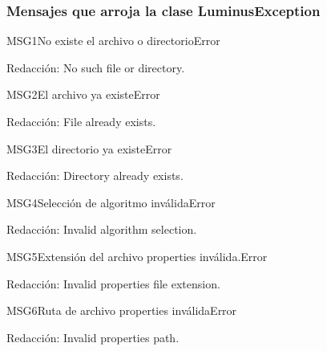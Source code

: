 \subsubsection{Mensajes que arroja la clase LuminusException}
\begin{mensaje}{MSG1}{No existe el archivo o directorio}{Error}
	\item[Redacción:] No such file or directory.
\end{mensaje}
\begin{mensaje}{MSG2}{El archivo ya existe}{Error}
	\item[Redacción:] File already exists.
\end{mensaje}
\begin{mensaje}{MSG3}{El directorio ya existe}{Error}
	\item[Redacción:] Directory already exists.
\end{mensaje}
\begin{mensaje}{MSG4}{Selección de algoritmo inválida}{Error}
	\item[Redacción:] Invalid algorithm selection.
\end{mensaje}
\begin{mensaje}{MSG5}{Extensión del archivo properties inválida.}{Error}
	\item[Redacción:] Invalid properties file extension.
\end{mensaje}
\begin{mensaje}{MSG6}{Ruta de archivo properties inválida}{Error}
	\item[Redacción:] Invalid properties path.
\end{mensaje}
